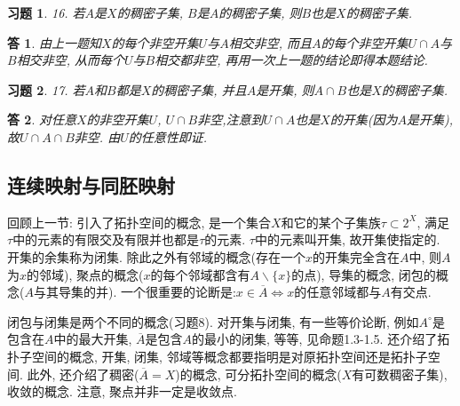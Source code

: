 \documentclass{ctexart}%
\newtheorem*{exercise}{习题}
\newtheorem*{solution}{答}
\theoremstyle{definition}
\theoremstyle{remark}
\begin{document}
\begin{exercise}16. 若$A$是$X$的稠密子集, $B$是$A$的稠密子集, 则$B$也是$X$的稠密子集.
\end{exercise}
\begin{solution}由上一题知$X$的每个非空开集$U$与$A$相交非空, 而且$A$的每个非空开集$U\cap A$与$B$相交非空, 从而每个$U$与$B$相交都非空, 再用一次上一题的结论即得本题结论. 
\end{solution}

\begin{exercise}17. 若$A$和$B$都是$X$的稠密子集, 并且$A$是开集, 则$A\cap B$也是$X$的稠密子集.
\end{exercise}
\begin{solution}对任意$X$的非空开集$U$, $U\cap B$非空,注意到$U\cap A$也是$X$的开集(因为$A$是开集), 故$U\cap A\cap B$非空. 由$U$的任意性即证. 
\end{solution}

\subsection{连续映射与同胚映射}

回顾上一节: 引入了拓扑空间的概念, 是一个集合$X$和它的某个子集族$\tau\subset 2^X$, 满足$\tau$中的元素的有限交及有限并也都是$\tau$的元素. $\tau$中的元素叫开集, 故开集使指定的. 开集的余集称为闭集. 除此之外有邻域的概念(存在一个$x$的开集完全含在$A$中, 则$A$为$x$的邻域), 聚点的概念($x$的每个邻域都含有$A\backslash\{x\}$的点), 导集的概念, 闭包的概念($A$与其导集的并). 一个很重要的论断是:$x\in \overline{A}\Longleftrightarrow x$的任意邻域都与$A$有交点. 

闭包与闭集是两个不同的概念(习题8). 对开集与闭集, 有一些等价论断, 例如$A^\circ$是包含在$A$中的最大开集, $\overline{A}$是包含$A$的最小的闭集, 等等, 见命题1.3-1.5. 还介绍了拓扑子空间的概念, 开集, 闭集, 邻域等概念都要指明是对原拓扑空间还是拓扑子空间. 此外, 还介绍了稠密($\overline{A}=X$)的概念, 可分拓扑空间的概念($X$有可数稠密子集), 收敛的概念. 注意, 聚点并非一定是收敛点. 
\end{document}
